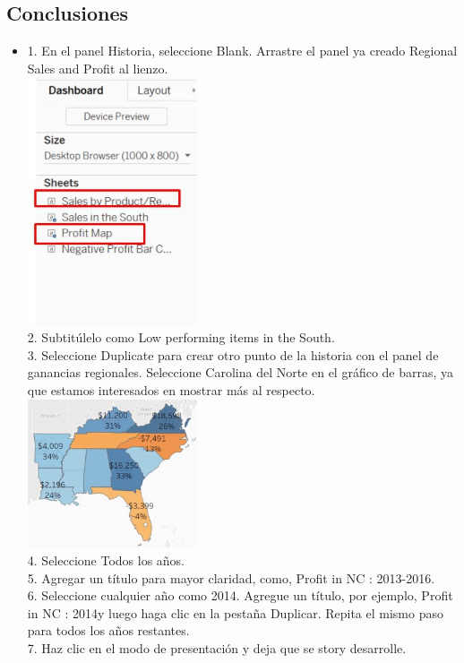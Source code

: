 \documentclass[preprint,12pt]{elsarticle}
\begin{document}
		\subsection{Conclusiones}
			\begin{itemize}
				\item 1. En el panel Historia, seleccione Blank. Arrastre el panel ya creado Regional Sales and
				Profit al lienzo.
				 		\\	\includegraphics[width=5cm]{./IMAGENES/7.2.1}
				\\ 2. Subtitúlelo como Low performing items in the South.
				\\ 3. Seleccione Duplicate para crear otro punto de la historia con el panel de ganancias
				regionales. Seleccione Carolina del Norte en el gráfico de barras, ya que estamos interesados en
				mostrar más al respecto.
					\\	\includegraphics[width=5cm]{./IMAGENES/7.2.2}
				\\ 4. Seleccione Todos los años.
				\\ 5. Agregar un título para mayor claridad, como, Profit in NC : 2013-2016.
				\\ 6. Seleccione cualquier año como 2014. Agregue un título, por ejemplo, Profit in NC :
				2014y luego haga clic en la pestaña Duplicar. Repita el mismo paso para todos los años
				restantes.
				\\ 7. Haz clic en el modo de presentación y deja que se story desarrolle.

\end{itemize}
\end{document}
